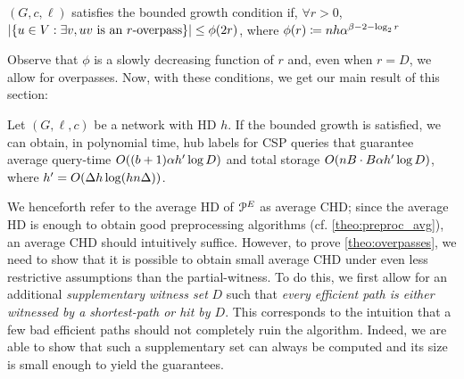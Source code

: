 \begin{definition}
$(G,c,\ell)$ satisfies the bounded growth condition if, $\forall r>0$, $\lvert\{u\in V: \exists v, uv \text{ is an $r$-overpass}\}\rvert\leq \phi(2r)$, where $\phi(r)\coloneqq nh\alpha^{\beta-2-\log_2r}$
\end{definition}

Observe that $\phi$ is a slowly decreasing function of $r$ and, even when $r=D$, we allow for overpasses.
Now, with these conditions, we get our main result of this section:


\begin{theorem}\label{theo:overpasses}
Let $(G,\ell,c)$ be a network with HD $h$.
If the bounded growth is satisfied, we can obtain, in polynomial time, hub labels for CSP queries that guarantee average query-time $O((b+1)\alpha h'\log D)$ and total storage $O(nB\cdot B\alpha h'\log D)$, where $h'=O(\Delta h\log(hn\Delta))$.
\end{theorem}

We henceforth refer to the average HD of $\mathcal{P}^E$ as average CHD; since the average HD is enough to obtain good preprocessing algorithms (cf. \cref{theo:preproc_avg}), an average CHD should intuitively suffice.
However, to prove \cref{theo:overpasses}, we need to show that it is possible to obtain small average CHD under even less restrictive assumptions than the partial-witness.
To do this, we first allow for an additional \emph{supplementary witness set} $D$ such that \emph{every efficient path is either witnessed by a shortest-path or hit by $D$}.
This corresponds to the intuition that a few bad efficient paths should not completely ruin the algorithm. 
Indeed, we are able to show that such a supplementary set can always be computed and its size is small enough to yield the guarantees.

